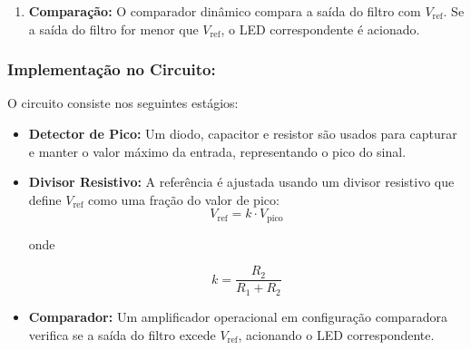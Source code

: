 \documentclass[a4paper, 12pt]{article}
\begin{document}
\begin{enumerate}
\begin{itemize}
    \item \textbf{Para o filtro Passa-Banda}:
        \begin{itemize}
            \item Quando $V_{in} = 1V$ e $445hz \leq f \leq 435hz$, a amplitude do sinal na saída do filtro é $\approx 311.5mV$;
            \item Quando $V_{in} = 2V$ e $445hz \leq f \leq 435hz$, a amplitude do sinal na saída do filtro é $\approx 622mV$;
        \end{itemize}

        Com isso, concluímos que a tensão de pico do filtro passa-baixa fica em torno de 31\% do pico do sinal de entrada.
    \end{itemize}
    
    Então, a proporção é definida por um fator $k$, que depende da faixa de frequência:
    \begin{itemize}
        \item $k \approx 63\%$ para frequências abaixo de $435\, \mathrm{Hz}$.
        \item $k \approx 31.1\%$ para a faixa entre $435\, \mathrm{Hz}$ e $445\, \mathrm{Hz}$.
        \item $k \approx 50\%$ para frequências acima de $445\, \mathrm{Hz}$.
    \end{itemize}
    
    \item \textbf{Comparação:} O comparador dinâmico compara a saída do filtro com $V_{\mathrm{ref}}$. Se a saída do filtro for menor que $V_{\mathrm{ref}}$, o LED correspondente é acionado.
\end{enumerate}

\subsubsection*{Implementação no Circuito:}
O circuito consiste nos seguintes estágios:
\begin{itemize}
    \item \textbf{Detector de Pico:} Um diodo, capacitor e resistor são usados para capturar e manter o valor máximo da entrada, representando o pico do sinal.
    \item \textbf{Divisor Resistivo:} A referência é ajustada usando um divisor resistivo que define $V_{\mathrm{ref}}$ como uma fração do valor de pico:
    \[
    V_{\mathrm{ref}} = k \cdot V_{\mathrm{pico}}
    \]

    onde 

    \[
        k = \frac{R_2}{R_1 + R_2}
    \]
        
    \item \textbf{Comparador:} Um amplificador operacional em configuração comparadora verifica se a saída do filtro excede $V_{\mathrm{ref}}$, acionando o LED correspondente.
\end{itemize}
\end{document}
